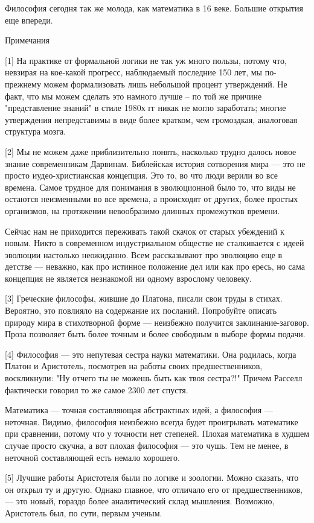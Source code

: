 \documentclass[ebook,12pt,oneside,openany]{memoir}
\begin{document}
Философия сегодня так же молода, как математика в 16 веке. Большие
открытия еще впереди.

Примечания

[1] На практике от формальной логики не так уж много пользы, потому
что, невзирая на кое-какой прогресс, наблюдаемый последние 150 лет, мы
по-прежнему можем формализовать лишь небольшой процент утверждений. Не
факт, что мы можем сделать это намного лучше -- по той же причине
"представление знаний" в стиле 1980х гг никак не могло заработать;
многие утверждения непредставимы в виде более кратком, чем громоздкая,
аналоговая структура мозга.

[2] Мы не можем даже приблизительно понять, насколько трудно далось
новое знание современникам Дарвинам. Библейская история сотворения
мира — это не просто иудео-христианская концепция. Это то, во что люди
верили во все времена. Самое трудное для понимания в эволюционной было
то, что виды не остаются неизменными во все времена, а происходят от
других, более простых организмов, на протяжении невообразимо длинных
промежутков времени.

Сейчас нам не приходится переживать такой скачок от старых убеждений к
новым. Никто в современном индустриальном обществе не сталкивается с
идеей эволюции настолько неожиданно. Всем рассказывают про эволюцию
еще в детстве — неважно, как про истинное положение дел или как про
ересь, но сама концепция не является незнакомой ни одному взрослому
человеку.

[3] Греческие философы, жившие до Платона, писали свои труды в стихах.
Вероятно, это повлияло на содержание их посланий. Попробуйте описать
природу мира в стихотворной форме — неизбежно получится
заклинание-заговор. Проза позволяет быть более точным и более
свободным в выборе формы подачи.

[4] Философия — это непутевая сестра науки математики. Она родилась,
когда Платон и Аристотель, посмотрев на работы своих предшественников,
воскликнули: "Ну отчего ты не можешь быть как твоя сестра?!" Причем
Расселл фактически говорил то же самое 2300 лет спустя.

Математика — точная составляющая абстрактных идей, а философия —
неточная. Видимо, философия неизбежно всегда будет проигрывать
математике при сравнении, потому что у точности нет степеней. Плохая
математика в худшем случае просто скучна, а вот плохая философия — это
чушь. Тем не менее, в неточной составляющей есть немало хорошего.

[5] Лучшие работы Аристотеля были по логике и зоологии. Можно сказать,
что он открыл ту и другую. Однако главное, что отличало его от
предшественников, — это новый, гораздо более аналитический склад
мышления. Возможно, Аристотель был, по сути, первым ученым.
\end{document}
